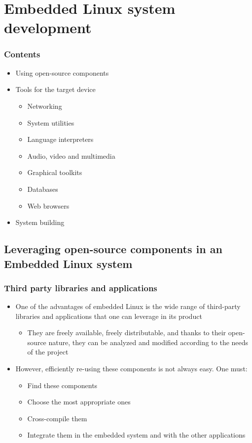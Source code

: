 \section{Embedded Linux system development}

\begin{frame}
  \frametitle{Contents}
  \begin{itemize}
  \item Using open-source components
  \item Tools for the target device
    \begin{itemize}
    \item Networking
    \item System utilities
    \item Language interpreters
    \item Audio, video and multimedia
    \item Graphical toolkits
    \item Databases
    \item Web browsers
    \end{itemize}
  \item System building
  \end{itemize}
\end{frame}

\subsection{Leveraging open-source components in an Embedded Linux
  system}

\begin{frame}
  \frametitle{Third party libraries and applications}
  \begin{itemize}
  \item One of the advantages of embedded Linux is the wide range of
    third-party libraries and applications that one can leverage in
    its product
    \begin{itemize}
    \item They are freely available, freely distributable, and thanks
      to their open-source nature, they can be analyzed and modified
      according to the needs of the project
    \end{itemize}
  \item However, efficiently re-using these components is not always
    easy. One must:
    \begin{itemize}
    \item Find these components
    \item Choose the most appropriate ones
    \item Cross-compile them
    \item Integrate them in the embedded system and with the other
      applications
    \end{itemize}
  \end{itemize}
\end{frame}

